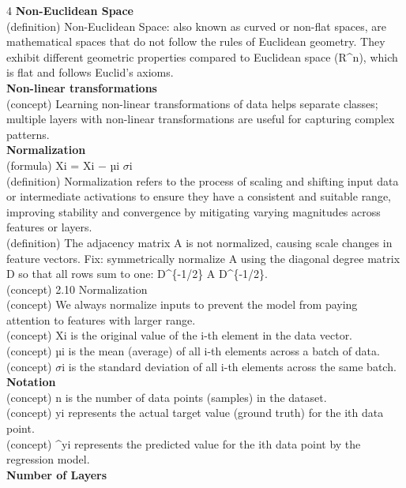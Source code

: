 \documentclass[8pt]{extarticle}
\begin{document}
\begin{multicols}{4}
{\vspace{2pt}\textbf{Non-Euclidean Space}\\
(definition) Non-Euclidean Space: also known as curved or non-flat spaces, are mathematical spaces that do not follow the rules of Euclidean geometry. They exhibit different geometric properties compared to Euclidean space (R\textasciicircum{}n), which is flat and follows Euclid's axioms.\\
\vspace{2pt}\textbf{Non-linear transformations}\\
(concept) Learning non-linear transformations of data helps separate classes; multiple layers with non-linear transformations are useful for capturing complex patterns.\\
\vspace{2pt}\textbf{Normalization}\\
(formula) Xi = Xi − µi $\sigma$i\\
(definition) Normalization refers to the process of scaling and shifting input data or intermediate activations to ensure they have a consistent and suitable range, improving stability and convergence by mitigating varying magnitudes across features or layers.\\
(definition) The adjacency matrix A is not normalized, causing scale changes in feature vectors. Fix: symmetrically normalize A using the diagonal degree matrix D so that all rows sum to one: D\textasciicircum{}\{-1/2\} A D\textasciicircum{}\{-1/2\}.\\
(concept) 2.10 Normalization\\
(concept) We always normalize inputs to prevent the model from paying attention to features with larger range.\\
(concept) Xi is the original value of the i-th element in the data vector.\\
(concept) µi is the mean (average) of all i-th elements across a batch of data.\\
(concept) $\sigma$i is the standard deviation of all i-th elements across the same batch.\\
\vspace{2pt}\textbf{Notation}\\
(concept) n is the number of data points (samples) in the dataset.\\
(concept) yi represents the actual target value (ground truth) for the ith data point.\\
(concept) \^{}yi represents the predicted value for the ith data point by the regression model.\\
\vspace{2pt}\textbf{Number of Layers}\\

}
\end{multicols}
\end{document}
